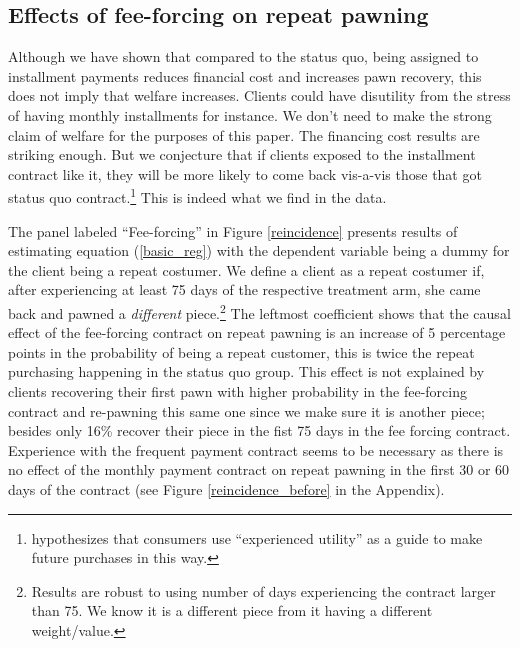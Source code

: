 \documentclass[oneside,11pt]{article}
\begin{document}
\subsection{Effects of fee-forcing on repeat pawning}

Although we have shown that compared to the status quo, being assigned to installment payments reduces financial cost and increases pawn recovery, this does not imply that welfare increases. Clients could have disutility from the stress of having monthly installments for instance. We don't need to make the strong claim of welfare for the purposes of this paper. The financing cost results are striking enough. But we conjecture that if clients exposed to the installment contract like it, they will be more likely to come back vis-a-vis those that got status quo contract.\footnote{\cite{Laibson2018} hypothesizes that consumers use ``experienced utility'' as a guide to make future purchases in this way.} This is indeed what we find in the data.

The panel labeled ``Fee-forcing'' in Figure \ref{reincidence} presents results of estimating equation (\ref{basic_reg}) with the dependent variable being a dummy for the client being a repeat costumer. We define a client as a repeat costumer if, after experiencing at least 75 days of the respective treatment arm, she came back and pawned a \textit{different} piece.\footnote{Results are robust to using number of days experiencing the contract larger than 75. We know it is a different piece from it having a different weight/value.}  The leftmost coefficient shows that the causal effect of the fee-forcing contract on repeat pawning is an increase of 5 percentage points in the probability of being a repeat customer, this is twice the repeat purchasing happening in the status quo group. This effect is not explained by clients recovering their first pawn with higher probability in the fee-forcing contract and re-pawning this same one since we make sure it is another piece; besides only 16\% recover their piece in the fist 75 days in the fee forcing contract. Experience with the frequent payment contract seems to be necessary as there is no effect of the monthly payment contract on repeat pawning in the first 30 or 60 days of the contract (see Figure \ref{reincidence_before} in the Appendix).
\end{document}
